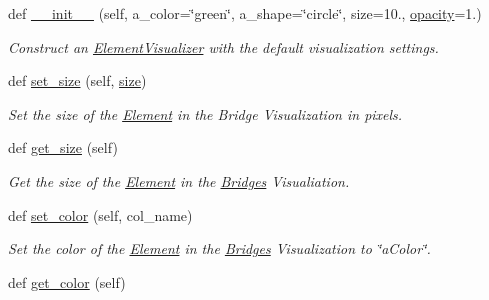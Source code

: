 \begin{DoxyCompactItemize}
\item 
def \mbox{\hyperlink{class_bridges_1_1_element_visualizer_1_1_element_visualizer_a39ab92e2b3e433aa9f3ebd18ac5e5e29}{\+\_\+\+\_\+init\+\_\+\+\_\+}} (self, a\+\_\+color=\char`\"{}green\char`\"{}, a\+\_\+shape=\char`\"{}circle\char`\"{}, size=10., \mbox{\hyperlink{class_bridges_1_1_element_visualizer_1_1_element_visualizer_ab26841a89ad63bac0828c15b01ec92b2}{opacity}}=1.)
\begin{DoxyCompactList}\small\item\em Construct an \mbox{\hyperlink{class_bridges_1_1_element_visualizer_1_1_element_visualizer}{Element\+Visualizer}} with the default visualization settings. \end{DoxyCompactList}\item 
def \mbox{\hyperlink{class_bridges_1_1_element_visualizer_1_1_element_visualizer_a7e309ec1893bd855c25d6efaf45711f8}{set\+\_\+size}} (self, \mbox{\hyperlink{class_bridges_1_1_element_visualizer_1_1_element_visualizer_a5d3eefae7745c6db65147c7b1361d208}{size}})
\begin{DoxyCompactList}\small\item\em Set the size of the \mbox{\hyperlink{namespace_bridges_1_1_element}{Element}} in the Bridge Visualization in pixels. \end{DoxyCompactList}\item 
def \mbox{\hyperlink{class_bridges_1_1_element_visualizer_1_1_element_visualizer_a12bbfd402a0e05e625d36f0ef5a3bcef}{get\+\_\+size}} (self)
\begin{DoxyCompactList}\small\item\em Get the size of the \mbox{\hyperlink{namespace_bridges_1_1_element}{Element}} in the \mbox{\hyperlink{namespace_bridges_1_1_bridges}{Bridges}} Visualiation. \end{DoxyCompactList}\item 
def \mbox{\hyperlink{class_bridges_1_1_element_visualizer_1_1_element_visualizer_aceb8f72766f7656162d0942891fc8f09}{set\+\_\+color}} (self, col\+\_\+name)
\begin{DoxyCompactList}\small\item\em Set the color of the \mbox{\hyperlink{namespace_bridges_1_1_element}{Element}} in the \mbox{\hyperlink{namespace_bridges_1_1_bridges}{Bridges}} Visualization to \char`\"{}a\+Color\char`\"{}. \end{DoxyCompactList}\item 
def \mbox{\hyperlink{class_bridges_1_1_element_visualizer_1_1_element_visualizer_ad53e64fed8aa62244cf0f83f2d7c2dcf}{get\+\_\+color}} (self)

\end{DoxyCompactItemize}
